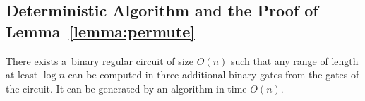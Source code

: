 \subsection{Deterministic Algorithm and the Proof of Lemma~\ref{lemma:permute}}\label{sec:deterministic}

\begin{lemma}\label{lemma:blocks}
	There exists a~binary regular circuit of size $O(n)$ such
	that any range
	of length at least $\log n$ can be computed in three
	additional binary gates from the gates of the circuit.
	It can be generated by an algorithm in time $O(n)$.
\end{lemma}

